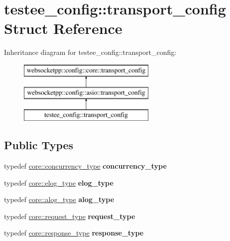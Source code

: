 \hypertarget{structtestee__config_1_1transport__config}{}\section{testee\+\_\+config\+:\+:transport\+\_\+config Struct Reference}
\label{structtestee__config_1_1transport__config}
Inheritance diagram for testee\+\_\+config\+:\+:transport\+\_\+config\+:\begin{figure}[H]
\begin{center}
\leavevmode
\includegraphics[height=3.000000cm]{structtestee__config_1_1transport__config}
\end{center}
\end{figure}
\subsection*{Public Types}
\begin{DoxyCompactItemize}
\item 
typedef \hyperlink{classwebsocketpp_1_1concurrency_1_1basic}{core\+::concurrency\+\_\+type} {\bfseries concurrency\+\_\+type}\hypertarget{structtestee__config_1_1transport__config_a3e5f3f833879358cf0847b941dce20d7}{}\label{structtestee__config_1_1transport__config_a3e5f3f833879358cf0847b941dce20d7}

\item 
typedef \hyperlink{classwebsocketpp_1_1log_1_1basic}{core\+::elog\+\_\+type} {\bfseries elog\+\_\+type}\hypertarget{structtestee__config_1_1transport__config_a710f854c150d2e7264da4dcb41b71164}{}\label{structtestee__config_1_1transport__config_a710f854c150d2e7264da4dcb41b71164}

\item 
typedef \hyperlink{classwebsocketpp_1_1log_1_1basic}{core\+::alog\+\_\+type} {\bfseries alog\+\_\+type}\hypertarget{structtestee__config_1_1transport__config_a471dcc3d893b6aa978c6cb4de3dcff39}{}\label{structtestee__config_1_1transport__config_a471dcc3d893b6aa978c6cb4de3dcff39}

\item 
typedef \hyperlink{classwebsocketpp_1_1http_1_1parser_1_1request}{core\+::request\+\_\+type} {\bfseries request\+\_\+type}\hypertarget{structtestee__config_1_1transport__config_aafcf1a7ce41624ff4510b831dd33cea4}{}\label{structtestee__config_1_1transport__config_aafcf1a7ce41624ff4510b831dd33cea4}

\item 
typedef \hyperlink{classwebsocketpp_1_1http_1_1parser_1_1response}{core\+::response\+\_\+type} {\bfseries response\+\_\+type}\hypertarget{structtestee__config_1_1transport__config_a16f9f3b90d5d958b851c46916c464d6f}{}\label{structtestee__config_1_1transport__config_a16f9f3b90d5d958b851c46916c464d6f}

\end{DoxyCompactItemize}
